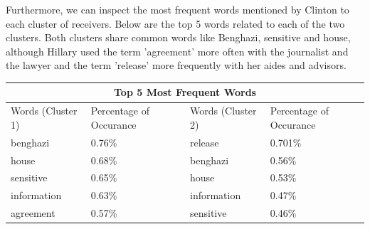 \newpage
Furthermore, we can inspect the most frequent words mentioned by Clinton to each cluster of receivers. Below are the top 5 words related to each of the two clusters. Both clusters share common words like Benghazi, sensitive and house, although Hillary used the term 'agreement' more often with the journalist and the lawyer and the term 'release' more frequently with her aides and advisors. 

\begin{center}
\begin{tabular}{ |p{3cm}|p{3cm}|| p{3cm}|p{3cm}|  }
 \hline
 \multicolumn{4}{|c|}{Top 5 Most Frequent Words} \\
 \hline
 Words (Cluster 1)  & Percentage of Occurance & Words (Cluster 2) & Percentage of Occurance\\
 \hline
 benghazi & 0.76\% & release  & 0.701\% \\
 house &  0.68\% & benghazi & 0.56\% \\
 sensitive & 0.65\% & house & 0.53\%\\
 information & 0.63\% & information & 0.47\%\\
 agreement & 0.57\% &  sensitive  & 0.46\% \\
 \hline
\end{tabular}
\end{center}
